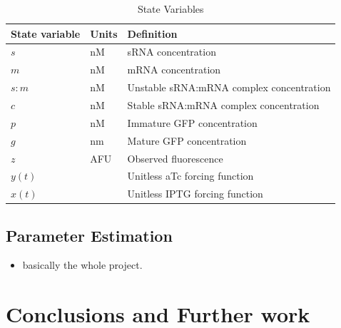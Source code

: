 \documentclass[10pt,journal]{./IEEE_latex_class/IEEEtran}
\begin{document}
\begin{table}[h]
\renewcommand{\arraystretch}{1.3}
\caption{State Variables}
\label{StateVariables}
\centering
\begin{tabular}{| l | l | l|}
\hline \textbf{State variable} & Units &  \textbf{Definition}  \\
\hline\hline $s$  & nM & sRNA concentration \\
\hline $m$ & nM & mRNA concentration  \\
\hline $s:m$ &  nM & Unstable sRNA:mRNA complex concentration  \\
\hline $c$ &  nM & Stable sRNA:mRNA complex concentration  \\
\hline $p$ & nM & Immature GFP concentration  \\
\hline $g$ &  nm & Mature GFP concentration  \\
\hline $z$ & AFU & Observed fluorescence  \\
\hline $y(t)$ & & Unitless aTc forcing function  \\
\hline $x(t)$ &  & Unitless IPTG forcing function  \\
\hline
\end{tabular}
\end{table}



\subsection{Parameter Estimation}
 \begin{itemize}
\item basically the whole project.
\cite{Isaacs2006}
 \end{itemize}
 
\section{Conclusions and Further work}
\label{Conclusions and Further work}




\end{document}
